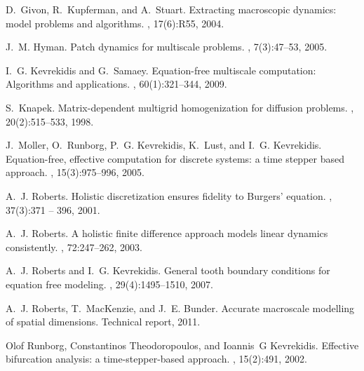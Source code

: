 \documentclass[12pt,a4paper]{article}
\begin{document}
\begin{thebibliography}{10} 
\itemsep=0pt \renewcommand{\url}[1]{} %

D.~Givon, R.~Kupferman, and A.~Stuart.
\newblock Extracting macroscopic dynamics: model problems and algorithms.
, 17(6):R55, 2004.
\newblock {}

J.~M. Hyman.
\newblock Patch dynamics for multiscale problems.
, 7(3):47--53, 2005.
\newblock \url{http://link.aip.org/link/?CSX/7/47/1}

I.~G. Kevrekidis and G.~Samaey.
\newblock Equation-free multiscale computation: Algorithms and applications.
, 60(1):321--344, 2009.
\newblock {}

S.~Knapek.
\newblock Matrix-dependent multigrid homogenization for diffusion problems.
, 20(2):515--533, 1998.
\newblock {}

J.~Moller, O.~Runborg, P.~G. Kevrekidis, K.~Lust, and I.~G. Kevrekidis.
\newblock Equation-free, effective computation for discrete systems: a time
  stepper based approach.
, 15(3):975--996,
  2005.

A.~J. Roberts.
\newblock Holistic discretization ensures fidelity to {B}urgers' equation.
, 37(3):371 -- 396, 2001.
\newblock {}

A.~J. Roberts.
\newblock A holistic finite difference approach models linear dynamics
  consistently.
, 72:247--262, 2003.
\newblock {}

A.~J. Roberts and I.~G. Kevrekidis.
\newblock General tooth boundary conditions for equation free modeling.
, 29(4):1495--1510, 2007.
\newblock {}

A.~J. Roberts, T.~MacKenzie, and J.~E. Bunder.
\newblock Accurate macroscale modelling of spatial dimensions.
\newblock Technical report, \url{http://arxiv.org/abs/1103.1187} 2011.

Olof Runborg, Constantinos Theodoropoulos, and Ioannis~G Kevrekidis.
\newblock Effective bifurcation analysis: a time-stepper-based approach.
, 15(2):491, 2002.


\end{thebibliography}
\end{document}
